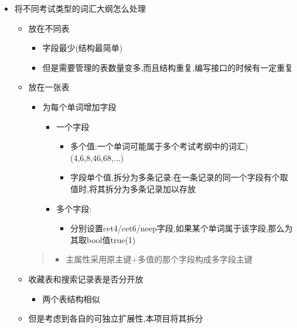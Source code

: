 \documentclass[
]{article}
\begin{document}
\begin{itemize}
\item
  将不同考试类型的词汇大纲怎么处理

  \begin{itemize}
  \item
    放在不同表

    \begin{itemize}
    \item
      字段最少(结构最简单)
    \item
      但是需要管理的表数量变多,而且结构重复,编写接口的时候有一定重复
    \end{itemize}
  \item
    放在一张表

    \begin{itemize}
    \item
      为每个单词增加字段

      \begin{itemize}
      \item
        一个字段

        \begin{itemize}
        \item
          多个值:一个单词可能属于多个考试考纲中的词汇)(4,6,8,46,68,...)
        \item
          字段单个值,拆分为多条记录:在一条记录的同一个字段有个取值时,将其拆分为多条记录加以存放
        \end{itemize}
      \item
        多个字段:

        \begin{itemize}
        \item
          分别设置cet4/cet6/neep字段,如果某个单词属于该字段,那么为其取bool值true(1)
        \end{itemize}
      \end{itemize}
    \end{itemize}

    \begin{quote}
    \begin{itemize}
    \item
      主属性采用原主键+多值的那个字段构成多字段主键
    \end{itemize}
    \end{quote}
  \item
    收藏表和搜索记录表是否分开放

    \begin{itemize}
    \item
      两个表结构相似
    \end{itemize}
  \item
    但是考虑到各自的可独立扩展性,本项目将其拆分
  \end{itemize}
\end{itemize}
\end{document}
